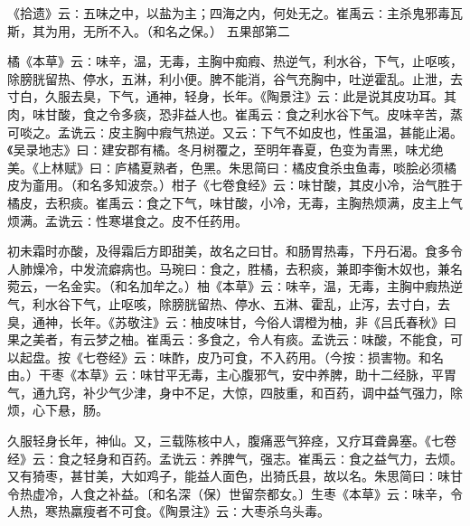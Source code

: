 \documentclass[a4paper,12pt,UTF8,twoside]{ctexbook}
\begin{document}
《拾遗》云∶五味之中，以盐为主；四海之内，何处无之。崔禹云∶主杀鬼邪毒瓦斯，其为用，无所不入。（和名之保。）
五果部第二

橘《本草》云∶味辛，温，无毒，主胸中痴瘕、热逆气，利水谷，下气，止呕咳，除膀胱留热、停水，五淋，利小便。脾不能消，谷气充胸中，吐逆霍乱。止泄，去寸白，久服去臭，下气，通神，轻身，长年。《陶景注》云∶此是说其皮功耳。其肉，味甘酸，食之令多痰，恐非益人也。崔禹云∶食之利水谷下气。皮味辛苦，蒸可啖之。孟诜云∶皮主胸中瘕气热逆。又云∶下气不如皮也，性虽温，甚能止渴。《吴录地志》曰∶建安郡有橘。冬月树覆之，至明年春夏，色变为青黑，味尤绝美。《上林赋》曰∶庐橘夏熟者，色黑。朱思简曰∶橘皮食杀虫鱼毒，啖脍必须橘皮为齑用。（和名多知波奈。）柑子《七卷食经》云∶味甘酸，其皮小冷，治气胜于橘皮，去积痰。崔禹云∶食之下气，味甘酸，小冷，无毒，主胸热烦满，皮主上气烦满。孟诜云∶性寒堪食之。皮不任药用。

初未霜时亦酸，及得霜后方即甜美，故名之曰甘。和肠胃热毒，下丹石渴。食多令人肺燥冷，中发流癖病也。马琬曰∶食之，胜橘，去积痰，兼即李衡木奴也，兼名菀云，一名金实。（和名加牟之。）柚《本草》云∶味辛，温，无毒，主胸中瘕热逆气，利水谷下气，止呕咳，除膀胱留热、停水、五淋、霍乱，止泻，去寸白，去臭，通神，长年。《苏敬注》云∶柚皮味甘，今俗人谓橙为柚，非《吕氏春秋》曰果之美者，有云梦之柚。崔禹云∶多食之，令人有痰。孟诜云∶味酸，不能食，可以起盘。按《七卷经》云∶味酢，皮乃可食，不入药用。（今按∶损害物。和名由。）干枣《本草》云∶味甘平无毒，主心腹邪气，安中养脾，助十二经脉，平胃气，通九窍，补少气少津，身中不足，大惊，四肢重，和百药，调中益气强力，除烦，心下悬，肠。

久服轻身长年，神仙。又，三载陈核中人，腹痛恶气猝痉，又疗耳聋鼻塞。《七卷经》云∶食之轻身和百药。孟诜云∶养脾气，强志。崔禹云∶食之益气力，去烦。又有猗枣，甚甘美，大如鸡子，能益人面色，出猗氏县，故以名。朱思简曰∶味甘令热虚冷，人食之补益。〔和名深（保）世留奈都女。〕生枣《本草》云∶味辛，令人热，寒热羸瘦者不可食。《陶景注》云∶大枣杀乌头毒。
\end{document}
